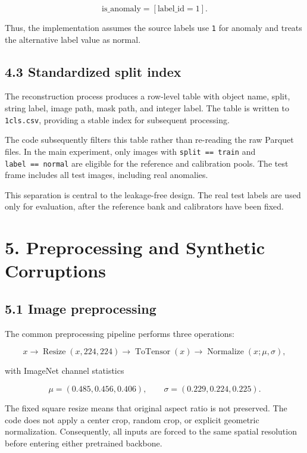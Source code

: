 \documentclass[
  11pt,
]{article}
\begin{document}
\[
\text{is\_anomaly} = [\text{label\_id}=1].
\]

Thus, the implementation assumes the source labels use \texttt{1} for
anomaly and treats the alternative label value as normal.

\subsection{4.3 Standardized split
index}\label{standardized-split-index}

The reconstruction process produces a row-level table with object name,
split, string label, image path, mask path, and integer label. The table
is written to \texttt{1cls.csv}, providing a stable index for subsequent
processing.

The code subsequently filters this table rather than re-reading the raw
Parquet files. In the main experiment, only images with
\texttt{split\ ==\ \textquotesingle{}train\textquotesingle{}} and
\texttt{label\ ==\ \textquotesingle{}normal\textquotesingle{}} are
eligible for the reference and calibration pools. The test frame
includes all test images, including real anomalies.

This separation is central to the leakage-free design. The real test
labels are used only for evaluation, after the reference bank and
calibrators have been fixed.

\section{5. Preprocessing and Synthetic
Corruptions}\label{preprocessing-and-synthetic-corruptions}

\subsection{5.1 Image preprocessing}\label{image-preprocessing}

The common preprocessing pipeline performs three operations:

\[
x
\rightarrow
\operatorname{Resize}(x,224,224)
\rightarrow
\operatorname{ToTensor}(x)
\rightarrow
\operatorname{Normalize}(x;\mu,\sigma),
\]

with ImageNet channel statistics

\[
\mu=(0.485,0.456,0.406),
\qquad
\sigma=(0.229,0.224,0.225).
\]

The fixed square resize means that original aspect ratio is not
preserved. The code does not apply a center crop, random crop, or
explicit geometric normalization. Consequently, all inputs are forced to
the same spatial resolution before entering either pretrained backbone.
\end{document}
